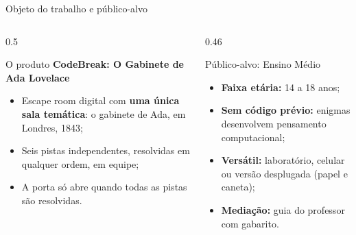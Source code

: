 \documentclass[aspectratio=169, 10pt, t]{beamer}
\begin{document}
\begin{frame}{Objeto do trabalho e público-alvo}
  \begin{columns}[T]
    \begin{column}{0.5\textwidth}
      \begin{card}{O produto}
        \textbf{CodeBreak: O Gabinete de Ada Lovelace}
        \begin{itemize}
          \item Escape room digital com \textbf{uma única sala temática}: o gabinete de Ada, em Londres, 1843;
          \item Seis pistas independentes, resolvidas em qualquer ordem, em equipe;
          \item A porta só abre quando todas as pistas são resolvidas.
        \end{itemize}
      \end{card}
    \end{column}
    \begin{column}{0.46\textwidth}
      \begin{card}{Público-alvo: Ensino Médio}
        \begin{itemize}
          \item \textbf{Faixa etária:} 14 a 18 anos;
          \item \textbf{Sem código prévio:} enigmas desenvolvem pensamento computacional;
          \item \textbf{Versátil:} laboratório, celular ou versão desplugada (papel e caneta);
          \item \textbf{Mediação:} guia do professor com gabarito.
        \end{itemize}
      \end{card}
    \end{column}
  \end{columns}
\end{frame}
\end{document}
